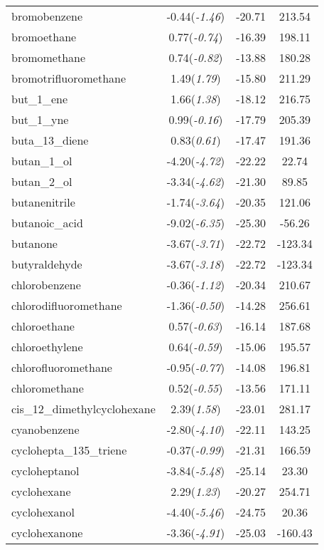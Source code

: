 \documentclass{amsart}
\begin{document}
\begin{center}
\begin{longtable}{l|c|c|c}
bromobenzene & -0.44(\textit{-1.46}) & -20.71 & 213.54 \\ 
bromoethane & 0.77(\textit{-0.74}) & -16.39 & 198.11 \\ 
bromomethane & 0.74(\textit{-0.82}) & -13.88 & 180.28 \\ 
bromotrifluoromethane & 1.49(\textit{1.79}) & -15.80 & 211.29 \\ 
but\_1\_ene & 1.66(\textit{1.38}) & -18.12 & 216.75 \\ 
but\_1\_yne & 0.99(\textit{-0.16}) & -17.79 & 205.39 \\ 
buta\_13\_diene & 0.83(\textit{0.61}) & -17.47 & 191.36 \\ 
butan\_1\_ol & -4.20(\textit{-4.72}) & -22.22 & 22.74 \\ 
butan\_2\_ol & -3.34(\textit{-4.62}) & -21.30 & 89.85 \\ 
butanenitrile & -1.74(\textit{-3.64}) & -20.35 & 121.06 \\ 
butanoic\_acid & -9.02(\textit{-6.35}) & -25.30 & -56.26 \\ 
butanone & -3.67(\textit{-3.71}) & -22.72 & -123.34 \\ 
butyraldehyde & -3.67(\textit{-3.18}) & -22.72 & -123.34 \\ 
chlorobenzene & -0.36(\textit{-1.12}) & -20.34 & 210.67 \\ 
chlorodifluoromethane & -1.36(\textit{-0.50}) & -14.28 & 256.61 \\ 
chloroethane & 0.57(\textit{-0.63}) & -16.14 & 187.68 \\ 
chloroethylene & 0.64(\textit{-0.59}) & -15.06 & 195.57 \\ 
chlorofluoromethane & -0.95(\textit{-0.77}) & -14.08 & 196.81 \\ 
chloromethane & 0.52(\textit{-0.55}) & -13.56 & 171.11 \\ 
cis\_12\_dimethylcyclohexane & 2.39(\textit{1.58}) & -23.01 & 281.17 \\ 
cyanobenzene & -2.80(\textit{-4.10}) & -22.11 & 143.25 \\ 
cyclohepta\_135\_triene & -0.37(\textit{-0.99}) & -21.31 & 166.59 \\ 
cycloheptanol & -3.84(\textit{-5.48}) & -25.14 & 23.30 \\ 
cyclohexane & 2.29(\textit{1.23}) & -20.27 & 254.71 \\ 
cyclohexanol & -4.40(\textit{-5.46}) & -24.75 & 20.36 \\ 
cyclohexanone & -3.36(\textit{-4.91}) & -25.03 & -160.43 \\ 

\end{longtable}
\end{center}
\end{document}

